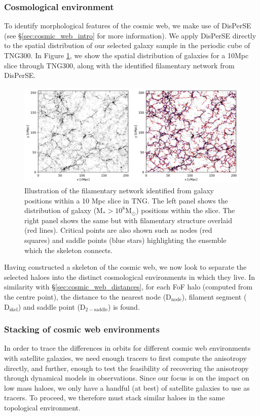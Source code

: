 \subsubsection{Cosmological environment}
To identify morphological features of the cosmic web, we make use of DisPerSE (see \S\ref{sec:cosmic_web_intro} for more information). We apply DisPerSE directly to the spatial distribution of our selected galaxy sample in the periodic cube of TNG300. In Figure \ref{fig:disperse_TNG300}, we show the spatial distribution of galaxies for a 10Mpc slice through TNG300, along with the identified filamentary network from DisPerSE.

\begin{figure}
	\includegraphics[width=\linewidth]{dyn_mod_files/TNG300-1-SM10-8-slice-galaxy-density-skeleton-comparison.png}
    \caption{Illustration of the filamentary network identified from galaxy positions within a 10 Mpc slice in TNG. The left panel shows the distribution of galaxy ($\mathrm{M_{\ast} > 10^{8}M_{\odot}}$) positions within the slice. The right panel shows the same but with filamentary structure overlaid (red lines). Critical points are also shown such as nodes (red squares) and saddle points (blue stars) highlighting the ensemble which the skeleton connects.}
    \label{fig:disperse_TNG300}
\end{figure}

Having constructed a skeleton of the cosmic web, we now look to separate the selected haloes into the distinct cosmological environments in which they live. In similarity with \S\ref{sec:cosmic_web_distances}, for each FoF halo (computed from the centre point), the distance to the nearest node ($\mathrm{D_{node}}$), filament segment ($\mathrm{D_{skel}}$) and saddle point ($\mathrm{D_{2-saddle}}$) is found. 

\subsubsection{Stacking of cosmic web environments} \label{sec:stacking}
In order to trace the differences in orbits for different cosmic web environments with satellite galaxies, we need enough tracers to first compute the anisotropy directly, and further, enough to test the feasibility of recovering the anisotropy through dynamical models in observations. Since our focus is on the impact on low mass haloes, we only have a handful (at best) of satellite galaxies to use as tracers. To proceed, we therefore must stack similar haloes in the same topological environment. 

